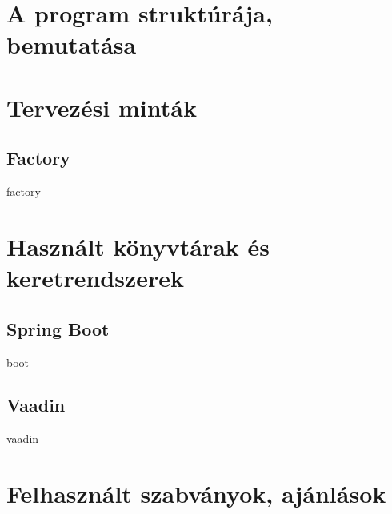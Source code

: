 \section{A program struktúrája, bemutatása}

\section{Tervezési minták}

\subsection{Factory}

factory







\section{Használt könyvtárak és keretrendszerek}



\subsection{Spring Boot}

boot



\subsection{Vaadin}

vaadin

\section{Felhasznált szabványok, ajánlások}







